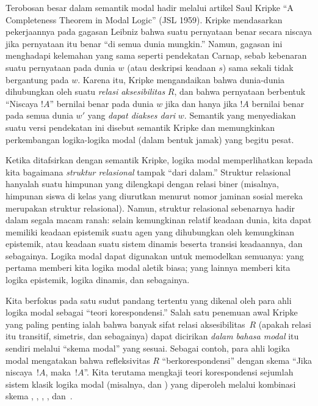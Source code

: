 \documentclass[../../../include/open-logic-section]{subfiles}
\begin{document}
Terobosan besar dalam semantik modal hadir melalui artikel Saul Kripke ``A
Completeness Theorem in Modal Logic'' (JSL 1959). Kripke mendasarkan
pekerjaannya pada gagasan Leibniz bahwa suatu pernyataan benar secara niscaya
jika pernyataan itu benar ``di semua dunia mungkin.'' Namun, gagasan ini
menghadapi kelemahan yang sama seperti pendekatan Carnap, sebab kebenaran
suatu pernyataan pada dunia $w$ (atau deskripsi keadaan $s$) sama sekali tidak
bergantung pada $w$. Karena itu, Kripke mengandaikan bahwa dunia-dunia
dihubungkan oleh suatu \emph{relasi aksesibilitas} $R$, dan bahwa pernyataan
berbentuk ``Niscaya $!A$'' bernilai benar pada dunia $w$ jika dan hanya jika
$!A$ bernilai benar pada semua dunia $w'$ yang \emph{dapat diakses dari}
$w$. Semantik yang menyediakan suatu versi pendekatan ini disebut semantik
Kripke dan memungkinkan perkembangan logika-logika modal (dalam bentuk
jamak) yang begitu pesat.

Ketika ditafsirkan dengan semantik Kripke, logika modal memperlihatkan kepada
kita bagaimana \emph{struktur relasional} tampak ``dari dalam.'' Struktur
relasional hanyalah suatu himpunan yang dilengkapi dengan relasi biner
(misalnya, himpunan siswa di kelas yang diurutkan menurut nomor jaminan sosial
mereka merupakan struktur relasional). Namun, struktur relasional sebenarnya
hadir dalam segala macam ranah: selain kemungkinan relatif keadaan dunia,
kita dapat memiliki keadaan epistemik suatu agen yang dihubungkan oleh
kemungkinan epistemik, atau keadaan suatu sistem dinamis beserta transisi
keadaannya, dan sebagainya. Logika modal dapat digunakan untuk memodelkan
semuanya: yang pertama memberi kita logika modal aletik biasa; yang lainnya
memberi kita logika epistemik, logika dinamis, dan sebagainya.

Kita berfokus pada satu sudut pandang tertentu yang dikenal oleh para ahli
logika modal sebagai ``teori korespondensi.'' Salah satu penemuan awal Kripke
yang paling penting ialah bahwa banyak sifat relasi aksesibilitas~$R$
(apakah relasi itu transitif, simetris, dan sebagainya) dapat dicirikan
\emph{dalam bahasa modal} itu sendiri melalui ``skema modal'' yang sesuai.
Sebagai contoh, para ahli logika modal mengatakan bahwa refleksivitas $R$
``berkorespondensi'' dengan skema ``Jika niscaya~$!A$, maka~$!A$''. Kita
terutama mengkaji teori korespondensi sejumlah sistem klasik logika modal
(misalnya,  dan ) yang diperoleh melalui kombinasi skema
, , , , dan~.
\end{document}
